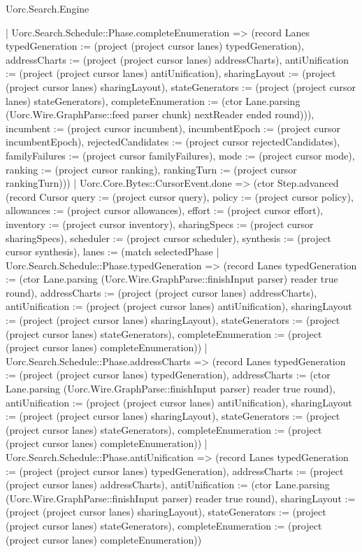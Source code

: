 \begin{lexlean}{Uorc.Search.Engine}
\begin{semanticmodule}
{{            | Uorc.Search.Schedule::Phase.completeEnumeration => (record Lanes {typedGeneration := (project (project cursor lanes) typedGeneration), addressCharts := (project (project cursor lanes) addressCharts), antiUnification := (project (project cursor lanes) antiUnification), sharingLayout := (project (project cursor lanes) sharingLayout), stateGenerators := (project (project cursor lanes) stateGenerators), completeEnumeration := (ctor Lane.parsing (Uorc.Wire.GraphParse::feed parser chunk) nextReader ended round)})), incumbent := (project cursor incumbent), incumbentEpoch := (project cursor incumbentEpoch), rejectedCandidates := (project cursor rejectedCandidates), familyFailures := (project cursor familyFailures), mode := (project cursor mode), ranking := (project cursor ranking), rankingTurn := (project cursor rankingTurn)}))
          | Uorc.Core.Bytes::CursorEvent.done => (ctor Step.advanced (record Cursor {query := (project cursor query), policy := (project cursor policy), allowances := (project cursor allowances), effort := (project cursor effort), inventory := (project cursor inventory), sharingSpecs := (project cursor sharingSpecs), scheduler := (project cursor scheduler), synthesis := (project cursor synthesis), lanes := (match selectedPhase
            | Uorc.Search.Schedule::Phase.typedGeneration => (record Lanes {typedGeneration := (ctor Lane.parsing (Uorc.Wire.GraphParse::finishInput parser) reader true round), addressCharts := (project (project cursor lanes) addressCharts), antiUnification := (project (project cursor lanes) antiUnification), sharingLayout := (project (project cursor lanes) sharingLayout), stateGenerators := (project (project cursor lanes) stateGenerators), completeEnumeration := (project (project cursor lanes) completeEnumeration)})
            | Uorc.Search.Schedule::Phase.addressCharts => (record Lanes {typedGeneration := (project (project cursor lanes) typedGeneration), addressCharts := (ctor Lane.parsing (Uorc.Wire.GraphParse::finishInput parser) reader true round), antiUnification := (project (project cursor lanes) antiUnification), sharingLayout := (project (project cursor lanes) sharingLayout), stateGenerators := (project (project cursor lanes) stateGenerators), completeEnumeration := (project (project cursor lanes) completeEnumeration)})
            | Uorc.Search.Schedule::Phase.antiUnification => (record Lanes {typedGeneration := (project (project cursor lanes) typedGeneration), addressCharts := (project (project cursor lanes) addressCharts), antiUnification := (ctor Lane.parsing (Uorc.Wire.GraphParse::finishInput parser) reader true round), sharingLayout := (project (project cursor lanes) sharingLayout), stateGenerators := (project (project cursor lanes) stateGenerators), completeEnumeration := (project (project cursor lanes) completeEnumeration)})
}}
\end{semanticmodule}
\end{lexlean}
